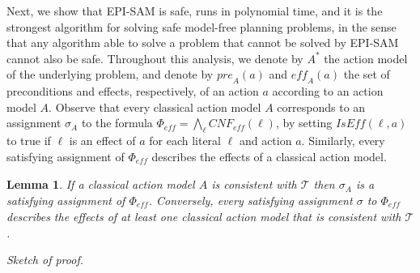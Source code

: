 \documentclass{article}
\theoremstyle{plain}
\newtheorem{lemma}[theorem]{Lemma}
\theoremstyle{definition}
\theoremstyle{remark}
\theoremstyle{observation}
\newcommand{\tuple}[1]{\ensuremath{\left \langle #1 \right \rangle }}
\newcommand{\pre}{\textit{pre}}
\newcommand{\eff}{\textit{eff}}
\newcommand{\cnf}{\textit{CNF}}
\newcommand{\true}{\textit{true}}
\newcommand{\iseff}{\textit{IsEff}}
\newcommand{\ispre}{\textit{IsPre}}
\newcommand{\state}{\textit{State}}
\begin{document}
Next, we show that EPI-SAM is safe, runs in polynomial time, and it is the strongest algorithm for solving safe model-free planning problems, in the sense that any algorithm able to solve a problem that cannot be solved by EPI-SAM cannot also be safe. 
Throughout this analysis, we denote by $A^*$ the action model of the underlying problem, and denote by $\pre_A(a)$ and $\eff_A(a)$ the set of preconditions and effects, respectively, of an action $a$ according to an action model $A$. 
Observe that every classical action model $A$ corresponds to an assignment $\sigma_A$ to the formula $\Phi_\eff=\bigwedge_\ell \cnf_\eff(\ell)$, by setting $\iseff(\ell,a)$ to true if $\ell$ is an effect of $a$ for each literal $\ell$ and action $a$. 
Similarly, every satisfying assignment of $\Phi_\eff$ describes the effects of a classical action model. 
\begin{lemma}\label{lem:cnf-char-appendix}
If a classical action model $A$ is consistent with $\mathcal{T}$
then $\sigma_A$ is a satisfying assignment of $\Phi_\eff$. 
Conversely, every satisfying assignment $\sigma$ to $\Phi_\eff$ describes the effects of at least one classical action model that is consistent with $\mathcal{T}$. 
\end{lemma}
\noindent
{\em Sketch of proof.}
\end{document}
